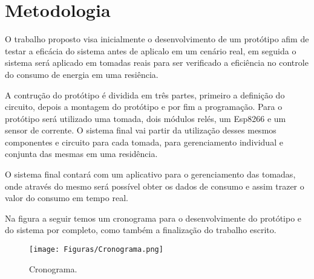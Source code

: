 \chapter{Metodologia}\label{CAP4}

O trabalho proposto visa inicialmente o desenvolvimento de um protótipo afim de testar a eficácia do sistema antes de aplicalo em um cenário real, em seguida o sistema será aplicado em tomadas reais para ser verificado a eficiência no controle do consumo de energia em uma resiência.

A contrução do protótipo é dividida em três partes, primeiro a definição do circuito, depois a montagem do protótipo e por fim a programação. Para o protótipo será utilizado uma tomada, dois módulos relés, um Esp8266 e um sensor de corrente. O sistema final vai partir da utilização desses mesmos componentes e circuito para cada tomada, para gerenciamento individual e conjunta das mesmas em uma residência.

O sistema final contará com um aplicativo para o gerenciamento das tomadas, onde através do mesmo será possível obter os dados de consumo e assim trazer o valor do consumo em tempo real.

Na figura a seguir temos um cronograma para o desenvolvimente do protótipo e do sistema por completo, como também a finalização do trabalho escrito.

\begin{figure} [H]
    \centering
    \texttt{[image: Figuras/Cronograma.png]}
    \caption{Cronograma.}
    \label{fig:my_label}
\end{figure}
